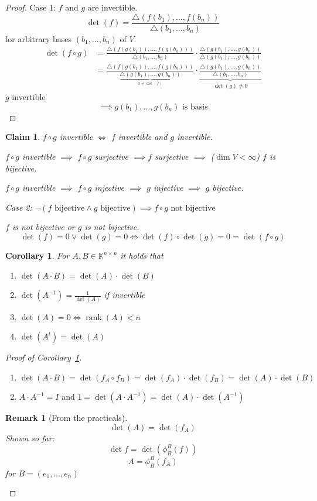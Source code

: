\documentclass{article}
\newtheorem*{claim}{Claim}%
\newtheorem{remark}{Remark}  \numberwithin{remark}{section}
\newtheorem*{corollary}{Corollary}%
\DeclareMathOperator{\rank}{rank}
\begin{document}
\begin{proof}
  Case 1: $f$ and $g$ are invertible.
  \[ \det(f) = \frac{\triangle (f(b_1), \dots, f(b_n))}{\triangle(b_1, \dots, b_n)} \]
  for arbitrary bases $(b_1, \dots, b_n)$ of $V$.
  \begin{align*}
    \det(f \circ g) &= \frac{\triangle(f(g(b_1)), \dots, f(g(b_n)))}{\triangle(b_1, \dots, b_n)} \cdot \frac{\triangle(g(b_1), \dots, g(b_n))}{\triangle(g(b_1), \dots, g(b_n))} \\
    	&= \frac{\triangle(f(g(b_1)), \dots, f(g(b_n)))}{\underbrace{\triangle(g(b_1), \dots, g(b_n))}_{0 \neq \det(f)}} \cdot \underbrace{\frac{\triangle(g(b_1), \dots, g(b_n))}{\triangle(b_1, \dots, b_n)}}_{\det(g) \neq 0}
  \end{align*}
  $g$ invertible
  \[ \implies g(b_1), \dots, g(b_n) \text{ is basis} \]
\end{proof}

\begin{claim}
  $f \circ g$ invertible $\iff$ $f$ invertible and $g$ invertible.

  $f \circ g$ invertible $\implies$ $f \circ g$ surjective $\implies f$ surjective $\implies$ ($\dim{V} < \infty$) $f$ is bijective.

  $f \circ g$ invertible $\implies$ $f \circ g$ injective $\implies$ $g$ injective $\implies$ $g$ bijective.

  Case 2: $\neg(f \text{ bijective} \land g \text{ bijective}) \implies f \circ g \text{ not bijective}$

  $f$ is not bijective or $g$ is not bijective.
  \[ \det(f) = 0 \lor \det(g) = 0 \iff \det(f) \circ \det(g) = 0 = \det(f \circ g) \]
\end{claim}

\begin{corollary} %
  \label{cor730}
  For $A, B \in \mathbb K^{n\times n}$ it holds that
  \begin{enumerate}
  	\item $\det(A \cdot B) = \det(A) \cdot \det(B)$
  	\item $\det(A^{-1}) = \frac{1}{\det(A)}$ if invertible
  	\item $\det(A) = 0 \iff \rank(A) < n$
  	\item $\det(A^t) = \det(A)$
  \end{enumerate}
\end{corollary}

\begin{proof}[Proof of Corollary~\ref{cor730}]
  \begin{enumerate}
  	\item $\det(A \cdot B) = \det(f_A \circ f_B) = \det(f_A) \cdot \det(f_B) = \det(A) \cdot \det(B)$
  	\item $A \cdot A^{-1} = I$ and $1 = \det(A \cdot A^{-1}) = \det(A) \cdot \det(A^{-1})$
  \end{enumerate}
  \begin{remark}[From the practicals]
    \[ \det(A) = \det(f_A) \]
    Shown so far:
    \[ \det{f} = \det\left(\phi_B^B(f)\right) \]
    \[ A = \phi_B^B\left(f_A\right) \]
    for $B = (e_1, \dots, e_n)$
  \end{remark}
\end{proof}
\end{document}
